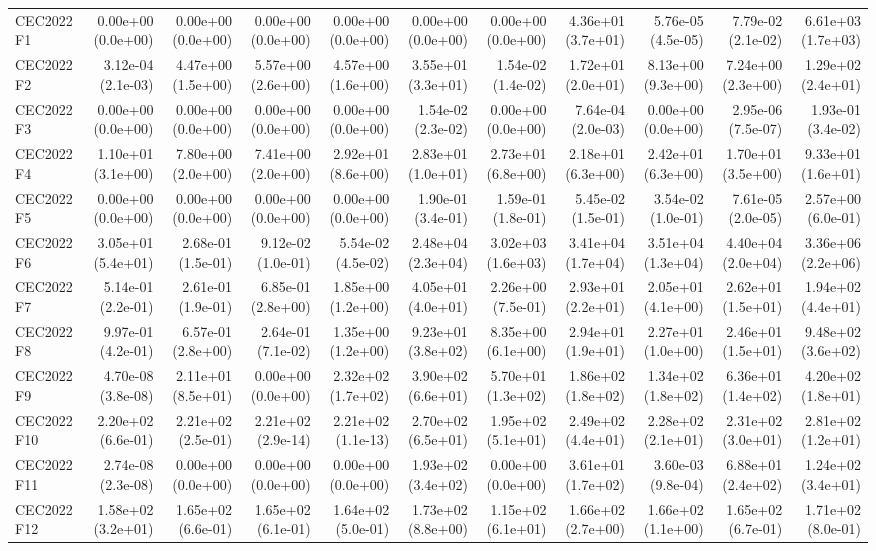 \begin{longtable}{lrrrrrrrrrr}
CEC2022 F1 & 0.00e+00 (0.0e+00) & 0.00e+00 (0.0e+00) & 0.00e+00 (0.0e+00) & 0.00e+00 (0.0e+00) & 0.00e+00 (0.0e+00) & 0.00e+00 (0.0e+00) & 4.36e+01 (3.7e+01) & 5.76e-05 (4.5e-05) & 7.79e-02 (2.1e-02) & 6.61e+03 (1.7e+03) \\
CEC2022 F2 & 3.12e-04 (2.1e-03) & 4.47e+00 (1.5e+00) & 5.57e+00 (2.6e+00) & 4.57e+00 (1.6e+00) & 3.55e+01 (3.3e+01) & 1.54e-02 (1.4e-02) & 1.72e+01 (2.0e+01) & 8.13e+00 (9.3e+00) & 7.24e+00 (2.3e+00) & 1.29e+02 (2.4e+01) \\
CEC2022 F3 & 0.00e+00 (0.0e+00) & 0.00e+00 (0.0e+00) & 0.00e+00 (0.0e+00) & 0.00e+00 (0.0e+00) & 1.54e-02 (2.3e-02) & 0.00e+00 (0.0e+00) & 7.64e-04 (2.0e-03) & 0.00e+00 (0.0e+00) & 2.95e-06 (7.5e-07) & 1.93e-01 (3.4e-02) \\
CEC2022 F4 & 1.10e+01 (3.1e+00) & 7.80e+00 (2.0e+00) & 7.41e+00 (2.0e+00) & 2.92e+01 (8.6e+00) & 2.83e+01 (1.0e+01) & 2.73e+01 (6.8e+00) & 2.18e+01 (6.3e+00) & 2.42e+01 (6.3e+00) & 1.70e+01 (3.5e+00) & 9.33e+01 (1.6e+01) \\
CEC2022 F5 & 0.00e+00 (0.0e+00) & 0.00e+00 (0.0e+00) & 0.00e+00 (0.0e+00) & 0.00e+00 (0.0e+00) & 1.90e-01 (3.4e-01) & 1.59e-01 (1.8e-01) & 5.45e-02 (1.5e-01) & 3.54e-02 (1.0e-01) & 7.61e-05 (2.0e-05) & 2.57e+00 (6.0e-01) \\
CEC2022 F6 & 3.05e+01 (5.4e+01) & 2.68e-01 (1.5e-01) & 9.12e-02 (1.0e-01) & 5.54e-02 (4.5e-02) & 2.48e+04 (2.3e+04) & 3.02e+03 (1.6e+03) & 3.41e+04 (1.7e+04) & 3.51e+04 (1.3e+04) & 4.40e+04 (2.0e+04) & 3.36e+06 (2.2e+06) \\
CEC2022 F7 & 5.14e-01 (2.2e-01) & 2.61e-01 (1.9e-01) & 6.85e-01 (2.8e+00) & 1.85e+00 (1.2e+00) & 4.05e+01 (4.0e+01) & 2.26e+00 (7.5e-01) & 2.93e+01 (2.2e+01) & 2.05e+01 (4.1e+00) & 2.62e+01 (1.5e+01) & 1.94e+02 (4.4e+01) \\
CEC2022 F8 & 9.97e-01 (4.2e-01) & 6.57e-01 (2.8e+00) & 2.64e-01 (7.1e-02) & 1.35e+00 (1.2e+00) & 9.23e+01 (3.8e+02) & 8.35e+00 (6.1e+00) & 2.94e+01 (1.9e+01) & 2.27e+01 (1.0e+00) & 2.46e+01 (1.5e+01) & 9.48e+02 (3.6e+02) \\
CEC2022 F9 & 4.70e-08 (3.8e-08) & 2.11e+01 (8.5e+01) & 0.00e+00 (0.0e+00) & 2.32e+02 (1.7e+02) & 3.90e+02 (6.6e+01) & 5.70e+01 (1.3e+02) & 1.86e+02 (1.8e+02) & 1.34e+02 (1.8e+02) & 6.36e+01 (1.4e+02) & 4.20e+02 (1.8e+01) \\
CEC2022 F10 & 2.20e+02 (6.6e-01) & 2.21e+02 (2.5e-01) & 2.21e+02 (2.9e-14) & 2.21e+02 (1.1e-13) & 2.70e+02 (6.5e+01) & 1.95e+02 (5.1e+01) & 2.49e+02 (4.4e+01) & 2.28e+02 (2.1e+01) & 2.31e+02 (3.0e+01) & 2.81e+02 (1.2e+01) \\
CEC2022 F11 & 2.74e-08 (2.3e-08) & 0.00e+00 (0.0e+00) & 0.00e+00 (0.0e+00) & 0.00e+00 (0.0e+00) & 1.93e+02 (3.4e+02) & 0.00e+00 (0.0e+00) & 3.61e+01 (1.7e+02) & 3.60e-03 (9.8e-04) & 6.88e+01 (2.4e+02) & 1.24e+02 (3.4e+01) \\
CEC2022 F12 & 1.58e+02 (3.2e+01) & 1.65e+02 (6.6e-01) & 1.65e+02 (6.1e-01) & 1.64e+02 (5.0e-01) & 1.73e+02 (8.8e+00) & 1.15e+02 (6.1e+01) & 1.66e+02 (2.7e+00) & 1.66e+02 (1.1e+00) & 1.65e+02 (6.7e-01) & 1.71e+02 (8.0e-01) \\
\bottomrule
\end{longtable}
